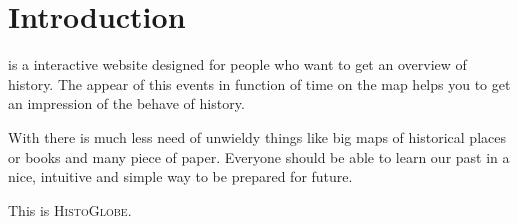 \section{Introduction} %
\label{sec:introduction}

\HG is a interactive website designed for people who want to get an overview of history. The appear of this events in function of time on the map helps you to get an impression of the behave of history.

With \HG there is much less need of unwieldy things like big maps of historical places or books and many piece of paper. Everyone should be able to learn our past in a nice, intuitive and simple way to be prepared for future.

This is \textsc{HistoGlobe}.

